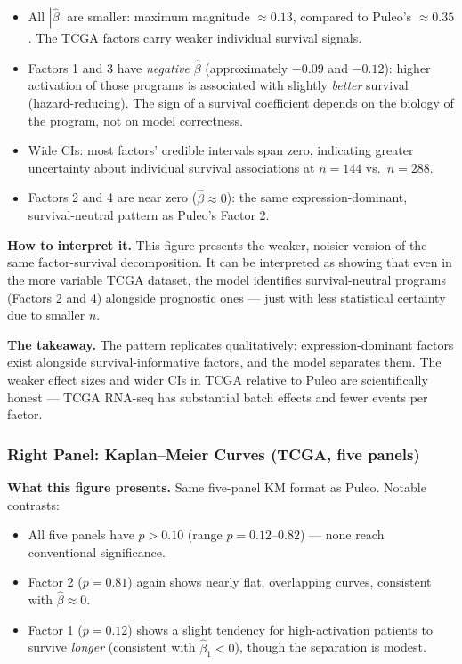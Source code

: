 \documentclass[11pt]{article}
\begin{document}
\begin{itemize}
  \item All $|\hat{\beta}|$ are smaller: maximum magnitude $\approx 0.13$, compared to Puleo's $\approx 0.35$. The TCGA factors carry weaker individual survival signals.
  \item Factors 1 and 3 have \emph{negative} $\hat{\beta}$ (approximately $-0.09$ and $-0.12$): higher activation of those programs is associated with slightly \emph{better} survival (hazard-reducing). The sign of a survival coefficient depends on the biology of the program, not on model correctness.
  \item Wide CIs: most factors' credible intervals span zero, indicating greater uncertainty about individual survival associations at $n = 144$ vs.\ $n = 288$.
  \item Factors 2 and 4 are near zero ($\hat{\beta} \approx 0$): the same expression-dominant, survival-neutral pattern as Puleo's Factor 2.
\end{itemize}

\textbf{How to interpret it.} This figure presents the weaker, noisier version of the same factor-survival decomposition. It can be interpreted as showing that even in the more variable TCGA dataset, the model identifies survival-neutral programs (Factors 2 and 4) alongside prognostic ones --- just with less statistical certainty due to smaller $n$.

\textbf{The takeaway.} The pattern replicates qualitatively: expression-dominant factors exist alongside survival-informative factors, and the model separates them. The weaker effect sizes and wider CIs in TCGA relative to Puleo are scientifically honest --- TCGA RNA-seq has substantial batch effects and fewer events per factor.

\subsubsection*{Right Panel: Kaplan--Meier Curves (TCGA, five panels)}

\textbf{What this figure presents.} Same five-panel KM format as Puleo. Notable contrasts:

\begin{itemize}
  \item All five panels have $p > 0.10$ (range $p = 0.12$--$0.82$) --- none reach conventional significance.
  \item Factor 2 ($p = 0.81$) again shows nearly flat, overlapping curves, consistent with $\hat{\beta} \approx 0$.
  \item Factor 1 ($p = 0.12$) shows a slight tendency for high-activation patients to survive \emph{longer} (consistent with $\hat{\beta}_1 < 0$), though the separation is modest.
\end{itemize}
\end{document}
